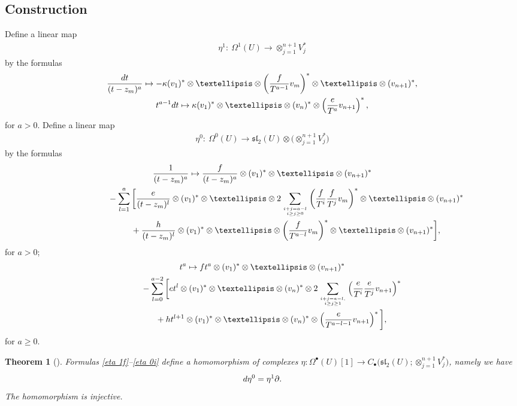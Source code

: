 \documentclass[11pt]{article}
\numberwithin{equation}{section}
\newtheorem{thm}{Theorem}[section]
\begin{document}
\subsection{Construction}\label{sec constr}
Define a linear map
\begin{gather*}
\eta^1\colon \ \Omega^1(U)\longrightarrow \otimes_{j=1}^{n+1} V_j^*
\end{gather*}
by the formulas
\begin{gather}
\frac{{\rm d}t}{(t-z_m)^{a}} \mapsto -\kappa (v_1)^*\otimes\dots\otimes \left(\frac{f}{T^{a-1}}v_m\right)^* \otimes\dots\otimes (v_{n+1})^*, \label{eta 1f} \\
t^{a-1}{\rm d}t \mapsto \kappa (v_1)^*\otimes\dots\otimes (v_n)^* \otimes \left(\frac{e}{T^{a}}v_{n+1}\right)^*, \label{eta 1i}
\end{gather}
for $a> 0$. Define a linear map
\begin{gather*}
\eta^0\colon \ \Omega^0(U)\longrightarrow \mathfrak{sl}_2(U)\otimes \big({\otimes}_{j=1}^{n+1} V_j^*\big)
\end{gather*}
by the formulas
\begin{gather}
\frac{1}{(t-z_m)^a} \mapsto \frac{f}{(t-z_m)^a}\otimes (v_1)^*\otimes\dots\otimes (v_{n+1})^*\nonumber\\
\hphantom{\frac{1}{(t-z_m)^a} \mapsto}{} -\sum_{l=1}^a\bigg[\frac{e}{(t-z_m)^l}\otimes (v_1)^*\otimes \dots\otimes 2\sum_{i+j=a-l \atop i\geq j\geq 0} \left(\frac{f}{T^i}\frac{f}{T^j}v_m\right)^*\otimes\dots\otimes (v_{n+1})^* \nonumber \\
\hphantom{\frac{1}{(t-z_m)^a} \mapsto}{} {} +\frac{h}{(t-z_m)^l}\otimes (v_1)^*\otimes \dots\otimes \left(\frac{f}{T^{a-l}}v_m\right)^*\otimes \dots\otimes (v_{n+1})^* \bigg],\label{eta 0f}
\end{gather}
for $a>0$;
\begin{gather}
t^a \mapsto ft^a\otimes (v_1)^*\otimes\dots\otimes (v_{n+1})^*\nonumber \\
\hphantom{t^a \mapsto}{} - \sum_{l=0}^{a-2}\bigg[et^l\otimes (v_1)^*\otimes\dots\otimes
(v_n)^*\otimes 2\sum_{i+j=a-l,\atop i\geq j\geq 1} \left(\frac{e}{T^i} \frac{e}{T^j}v_{n+1}\right)^* \nonumber \\
\hphantom{t^a \mapsto}{} + ht^{l+1}\otimes (v_1)^*\otimes\dots\otimes (v_n)^*\otimes \left(\frac{e}{T^{a-l-1}}v_{n+1}\right)^* \bigg],\label{eta 0i}
\end{gather}
for $a\geq 0$.

\begin{thm}[{\cite[Theorem 5.12]{SV2}}]\label{thm hom} Formulas \eqref{eta 1f}--\eqref{eta 0i} define a homomorphism of complexes $\eta\colon \Omega^{\bullet}(U)[1] \to C_{\bullet}\big(\mathfrak{sl}_2(U);\otimes_{j=1}^{n+1} V_j^*\big)$, namely we have
\begin{gather*}%
{\rm d} \eta^0 = \eta^1\partial.
\end{gather*}
The homomorphism is injective.
\end{thm}
\end{document}
